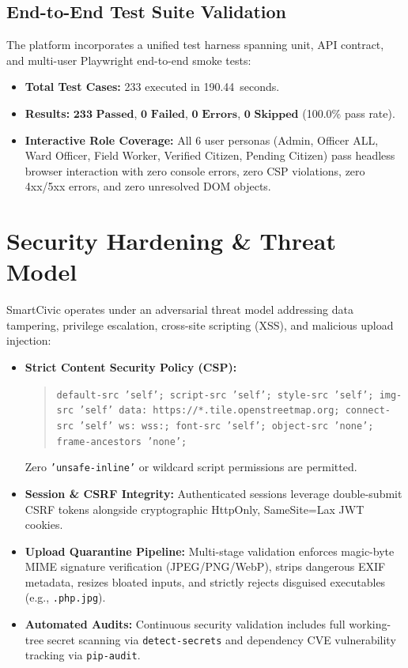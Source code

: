 \documentclass[conference]{IEEEtran}
\begin{document}
\subsection{End-to-End Test Suite Validation}
The platform incorporates a unified test harness spanning unit, API contract, and multi-user Playwright end-to-end smoke tests:
\begin{itemize}
    \item \textbf{Total Test Cases:} 233 executed in 190.44~seconds.
    \item \textbf{Results:} $\mathbf{233\text{ Passed}}$, $\mathbf{0\text{ Failed}}$, $\mathbf{0\text{ Errors}}$, $\mathbf{0\text{ Skipped}}$ (100.0\% pass rate).
    \item \textbf{Interactive Role Coverage:} All 6 user personas (Admin, Officer ALL, Ward Officer, Field Worker, Verified Citizen, Pending Citizen) pass headless browser interaction with zero console errors, zero CSP violations, zero 4xx/5xx errors, and zero unresolved DOM objects.
\end{itemize}

\section{Security Hardening \& Threat Model}
\label{sec:security}

SmartCivic operates under an adversarial threat model addressing data tampering, privilege escalation, cross-site scripting (XSS), and malicious upload injection:
\begin{itemize}
    \item \textbf{Strict Content Security Policy (CSP):}
    \begin{quote}
        \scriptsize
        \texttt{default-src 'self'; script-src 'self'; style-src 'self'; img-src 'self' data: https://*.tile.openstreetmap.org; connect-src 'self' ws: wss:; font-src 'self'; object-src 'none'; frame-ancestors 'none';}
    \end{quote}
    Zero \texttt{'unsafe-inline'} or wildcard script permissions are permitted.
    \item \textbf{Session \& CSRF Integrity:} Authenticated sessions leverage double-submit CSRF tokens alongside cryptographic HttpOnly, SameSite=Lax JWT cookies.
    \item \textbf{Upload Quarantine Pipeline:} Multi-stage validation enforces magic-byte MIME signature verification (JPEG/PNG/WebP), strips dangerous EXIF metadata, resizes bloated inputs, and strictly rejects disguised executables (e.g., \texttt{.php.jpg}).
    \item \textbf{Automated Audits:} Continuous security validation includes full working-tree secret scanning via \texttt{detect-secrets} and dependency CVE vulnerability tracking via \texttt{pip-audit}.
\end{itemize}
\end{document}
